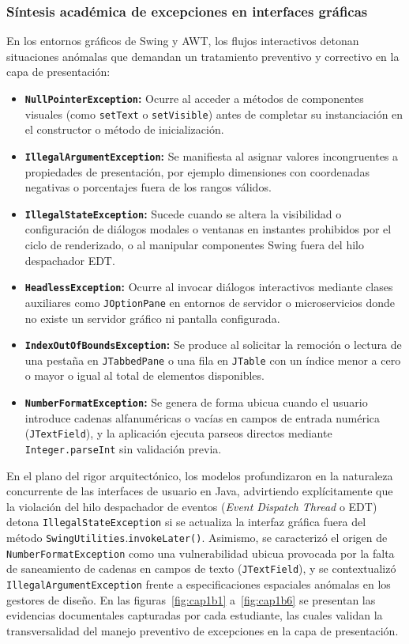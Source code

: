 \documentclass[letterpaper,12pt,oneside]{article}
\numberwithin{figure}{section}
\begin{document}
\subsubsection{Síntesis académica de excepciones en interfaces gráficas}
En los entornos gráficos de Swing y AWT, los flujos interactivos detonan situaciones anómalas que demandan un tratamiento preventivo y correctivo en la capa de presentación:
\begin{itemize}
  \item \textbf{\texttt{NullPointerException}:} Ocurre al acceder a métodos de componentes visuales (como \texttt{setText} o \texttt{setVisible}) antes de completar su instanciación en el constructor o método de inicialización.
  \item \textbf{\texttt{IllegalArgumentException}:} Se manifiesta al asignar valores incongruentes a propiedades de presentación, por ejemplo dimensiones con coordenadas negativas o porcentajes fuera de los rangos válidos.
  \item \textbf{\texttt{IllegalStateException}:} Sucede cuando se altera la visibilidad o configuración de diálogos modales o ventanas en instantes prohibidos por el ciclo de renderizado, o al manipular componentes Swing fuera del hilo despachador EDT.
  \item \textbf{\texttt{HeadlessException}:} Ocurre al invocar diálogos interactivos mediante clases auxiliares como \texttt{JOptionPane} en entornos de servidor o microservicios donde no existe un servidor gráfico ni pantalla configurada.
  \item \textbf{\texttt{IndexOutOfBoundsException}:} Se produce al solicitar la remoción o lectura de una pestaña en \texttt{JTabbedPane} o una fila en \texttt{JTable} con un índice menor a cero o mayor o igual al total de elementos disponibles.
  \item \textbf{\texttt{NumberFormatException}:} Se genera de forma ubicua cuando el usuario introduce cadenas alfanuméricas o vacías en campos de entrada numérica (\texttt{JTextField}), y la aplicación ejecuta parseos directos mediante \texttt{Integer.parseInt} sin validación previa.
\end{itemize}

{\sloppy En el plano del rigor arquitectónico, los modelos profundizaron en la naturaleza concurrente de las interfaces de usuario en Java, advirtiendo explícitamente que la violación del hilo despachador de eventos (\textit{Event Dispatch Thread} o EDT) detona \texttt{IllegalStateException} si se actualiza la interfaz gráfica fuera del método \texttt{SwingUtilities}.\allowbreak\texttt{invokeLater()}. Asimismo, se caracterizó el origen de \texttt{NumberFormatException} como una vulnerabilidad ubicua provocada por la falta de saneamiento de cadenas en campos de texto (\texttt{JTextField}), y se contextualizó \texttt{IllegalArgumentException} frente a especificaciones espaciales anómalas en los gestores de diseño. En las figuras~\ref{fig:cap1b1} a~\ref{fig:cap1b6} se presentan las evidencias documentales capturadas por cada estudiante, las cuales validan la transversalidad del manejo preventivo de excepciones en la capa de presentación.\par}
\end{document}
